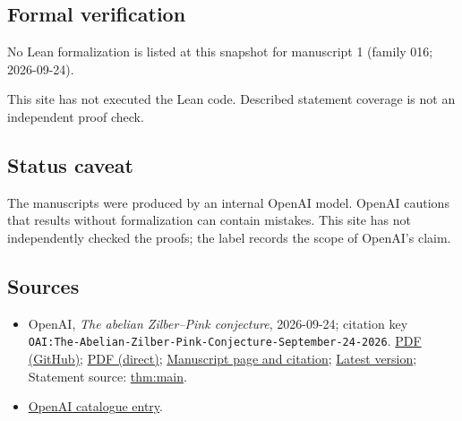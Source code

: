 \documentclass[11pt]{article}
\begin{document}
\subsection{Formal verification}
No Lean formalization is listed at this snapshot for manuscript 1 (family 016; 2026-09-24).

This site has not executed the Lean code. Described statement coverage is not an independent proof check.

\subsection{Status caveat}
The manuscripts were produced by an internal OpenAI model. OpenAI cautions that results without formalization can contain mistakes. This site has not independently checked the proofs; the label records the scope of OpenAI's claim.

\subsection{Sources}
\begin{itemize}
\item OpenAI, \emph{The abelian Zilber–Pink conjecture}, 2026-09-24; citation key \texttt{OAI:The-Abelian-Zilber-Pink-Conjecture-September-24-2026}. \href{https://github.com/openai/math/blob/adc7f1241b42e322a6451854ab7e4b4c146bf78a/preprints/The-Abelian-Zilber-Pink-Conjecture-September-24-2026/paper.pdf}{PDF (GitHub)}; \href{https://github.com/openai/math/raw/adc7f1241b42e322a6451854ab7e4b4c146bf78a/preprints/The-Abelian-Zilber-Pink-Conjecture-September-24-2026/paper.pdf}{PDF (direct)}; \href{https://github.com/openai/math/blob/adc7f1241b42e322a6451854ab7e4b4c146bf78a/preprints/The-Abelian-Zilber-Pink-Conjecture-September-24-2026/README.md}{Manuscript page and citation}; \href{https://github.com/openai/math/blob/main/preprints/The-Abelian-Zilber-Pink-Conjecture-September-24-2026/paper.pdf}{Latest version}; Statement source: \href{https://github.com/openai/math/blob/adc7f1241b42e322a6451854ab7e4b4c146bf78a/preprints/The-Abelian-Zilber-Pink-Conjecture-September-24-2026/build/sections/01-introduction.tex\#L43}{thm:main}.
\item \href{https://github.com/openai/math/blob/adc7f1241b42e322a6451854ab7e4b4c146bf78a/CONTENTS.md}{OpenAI catalogue entry}.
\end{itemize}
\end{document}
